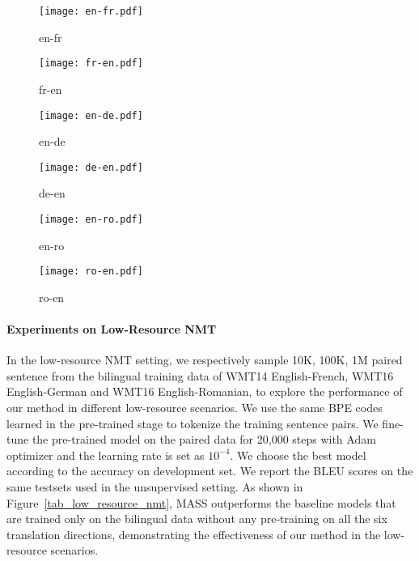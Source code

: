 \documentclass{article}
\begin{document}
	\begin{figure*}[h] 
		\centering
		\begin{subfigure}[h]{0.15\textwidth}
			\centering
			\texttt{[image: en-fr.pdf]}
			\vspace{-0.5cm}
			\caption{en-fr}
		\end{subfigure}
		\begin{subfigure}[h]{0.15\textwidth}
			\centering
			\texttt{[image: fr-en.pdf]}
			\vspace{-0.5cm}
			\caption{fr-en}
		\end{subfigure}	
		\begin{subfigure}[h]{0.15\textwidth}
			\centering
			\texttt{[image: en-de.pdf]}
			\vspace{-0.5cm}
			\caption{en-de}
		\end{subfigure}
		\begin{subfigure}[h]{0.15\textwidth}
			\centering
			\texttt{[image: de-en.pdf]}
			\vspace{-0.5cm}
			\caption{de-en}
		\end{subfigure}
		\begin{subfigure}[h]{0.15\textwidth}
			\centering
			\texttt{[image: en-ro.pdf]}
			\vspace{-0.5cm}
			\caption{en-ro}
		\end{subfigure}	
		\begin{subfigure}[h]{0.15\textwidth}
			\centering
			\texttt{[image: ro-en.pdf]}
			\vspace{-0.5cm}
			\caption{ro-en}
		\end{subfigure}	
		\vspace{-0.2cm}
		\caption{The BLEU score comparisons between MASS and the baseline on low-resource NMT with different scales of paired data.}
		\label{tab_low_resource_nmt}
	\end{figure*}
	
	\paragraph{Experiments on Low-Resource NMT}
	In the low-resource NMT setting, we respectively sample 10K, 100K, 1M paired sentence from the bilingual training data of WMT14 English-French, WMT16 English-German and WMT16 English-Romanian, to explore the performance of our method in different low-resource scenarios. We use the same BPE codes learned in the pre-trained stage to tokenize the training sentence pairs. We fine-tune the pre-trained model on the paired data for 20,000 steps with Adam optimizer and the learning rate is set as $10^{-4}$. We choose the best model according to the accuracy on development set. We report the BLEU scores on the same testsets used in the unsupervised setting. As shown in Figure~\ref{tab_low_resource_nmt}, MASS outperforms the baseline models that are trained only on the bilingual data without any pre-training on all the six translation directions, demonstrating the effectiveness of our method in the low-resource scenarios.
	
\end{document}
